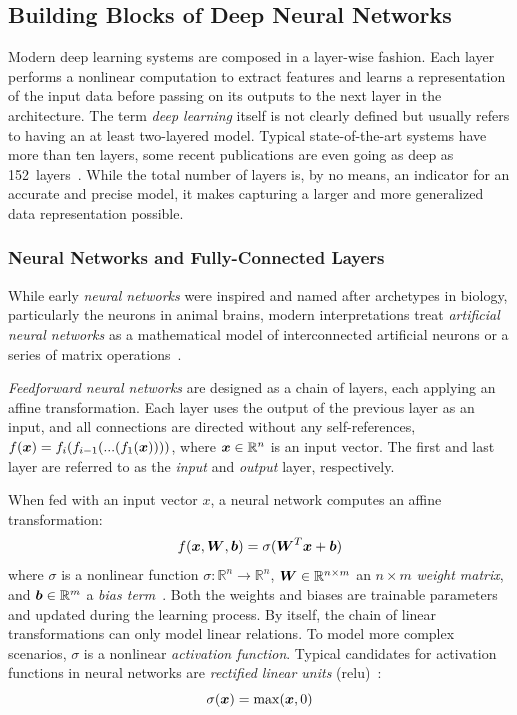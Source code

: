\subsection{Building Blocks of Deep Neural Networks}
Modern deep learning systems are composed in a layer-wise fashion. Each layer performs a nonlinear computation to extract features and learns a representation of the input data before passing on its outputs to the next layer in the architecture. The term \emph{deep learning} itself is not clearly defined but usually refers to having an at least two-layered model. Typical state-of-the-art systems have more than ten layers, some recent publications are even going as deep as \num{152}~layers~\cite{he2016deep}. While the total number of layers is, by no means, an indicator for an accurate and precise model, it makes capturing a larger and more generalized data representation possible.

\subsubsection{Neural Networks and Fully-Connected Layers}
While early \emph{neural networks} were inspired and named after archetypes in biology, particularly the neurons in animal brains, modern interpretations treat \emph{artificial neural networks} as a mathematical model of interconnected artificial neurons or a series of matrix operations~\cite{mcculloch1943logical, rosenblatt1958perceptron}.

\emph{Feedforward neural networks} are designed as a chain of layers, each applying an affine transformation. Each layer uses the output of the previous layer as an input, and all connections are directed without any self-references, $ f(\boldsymbol{x}) = f_i(f_{i-1}(...(f_1(\boldsymbol{x})))) $, where $\boldsymbol{x} \in \mathbb{R}^n $ is an input vector. The first and last layer are referred to as the \emph{input} and \emph{output} layer, respectively.

When fed with an input vector $x$, a neural network computes an affine transformation:
$$
f(\boldsymbol{x}, \boldsymbol{W}, \boldsymbol{b}) = \sigma(\boldsymbol{W}^T\boldsymbol{x} + \boldsymbol{b})
$$
where $\sigma$ is a nonlinear function $\sigma: \mathbb{R}^n \rightarrow \mathbb{R}^n$, $\boldsymbol{W} \in\mathbb{R}^{n \times m} $ an $n \times m$ \emph{weight matrix}, and $\boldsymbol{b} \in\mathbb{R}^m $ a \emph{bias term}~\cite[p.~192]{Goodfellow-et-al-2016}. Both the weights and biases are trainable parameters and updated during the learning process. By itself, the chain of linear transformations can only model linear relations. To model more complex scenarios, $\sigma$ is a nonlinear \emph{activation function}. Typical candidates for activation functions in neural networks are \emph{rectified linear units} (\ac{relu})~\cite{nair2010rectified}:
$$
\sigma(\boldsymbol{x}) = \operatorname{max}(\boldsymbol{x}, 0)
$$

